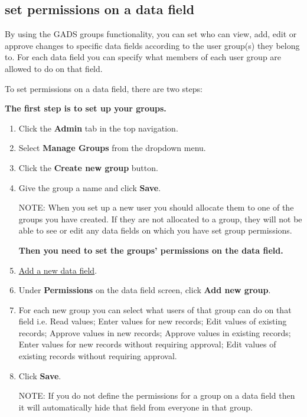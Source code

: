 \documentclass{ctrlo-int-toc}
\begin{document}
\begin{admin}
\subsection[set permissions on a data field]{set permissions on a data field}
\label{subsec:setfieldperms}
By using the GADS groups functionality, you can set who can view, add, edit or approve changes to specific data fields according to the user group(s) they belong to. For each data field you can specify what members of each user group are allowed to do on that field.

To set permissions on a data field, there are two steps:

\textbf{The first step is to set up your groups.}

\begin{enumerate}
    \item Click the \textbf{Admin} tab in the top navigation.
    \item Select \textbf{Manage Groups} from the dropdown menu.
    \item Click the \textbf{Create new group} button.
    \item Give the group a name and click \textbf{Save}.

\begin{notebox}
NOTE: When you set up a new user you should allocate them to one of the groups you have created. If they are not allocated to a group, they will not be able to see or edit any data fields on which you have set group permissions.
\end{notebox}

\textbf{Then you need to set the groups’ permissions on the data field.}

    \item \hyperref[subsec:addfield]{Add a new data field}.
    \item Under \textbf{Permissions} on the data field screen, click \textbf{Add new group}.
    \item For each new group you can select what users of that group can do on that field i.e. Read values; Enter values for new records; Edit values of existing records; Approve values in new records; Approve values in existing records; Enter values for new records without requiring approval; Edit values of existing records without requiring approval.
    \item Click \textbf{Save}.

\begin{notebox}
NOTE: If you do not define the permissions for a group on a data field then it will automatically hide that field from everyone in that group. 
\end{notebox}


\end{enumerate}
\end{admin}
\end{document}
